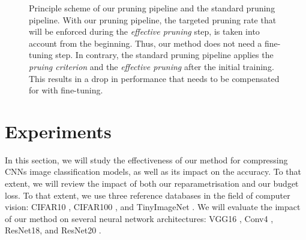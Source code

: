 \begin{figure}
\centering
{}
  \caption{ Principle scheme of our pruning pipeline and the standard
  pruning pipeline. With our pruning pipeline, the targeted pruning rate that will
  be enforced during the \emph{effective pruning} step, is taken into account
  from the beginning. Thus, our method does not need a fine-tuning step. In
  contrary, the standard pruning pipeline applies the \emph{pruing criterion}
  and the \emph{effective pruning} after the initial training. This results in a
  drop in performance that needs to be compensated for with fine-tuning.}
  \label{fig:chap1:pruning_pipeline_comparison}
\end{figure}


\section{Experiments}
\label{sec:chap1:experiments}
In this section, we will study the effectiveness of our method for compressing
\aclp{CNN} image classification models, as well as its impact on the accuracy.
To that extent, we will review the impact of both our reparametrisation and our
budget loss. To that extent, we use three reference databases in the field of
computer vision: CIFAR10 \cite{CIFARdataset}, CIFAR100 \cite{CIFARdataset}, and
TinyImageNet \cite{TinyImageNet}. We will evaluate the impact of our method on
several neural network architectures: VGG16
\cite{DBLP:journals/corr/SimonyanZ14a}, Conv4 \cite{DBLP:conf/iclr/FrankleC19},
ResNet18, and ResNet20 \cite{DBLP:conf/cvpr/HeZRS16}. \\

